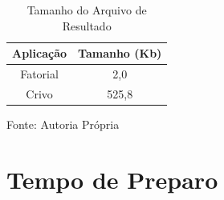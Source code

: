 \begin{table}[hbtp]
\begin{center}
\caption{Tamanho do Arquivo de Resultado}
\label{tab:tam_arquivo}
\begin{tabular}{c|c}
	\hline
		{\bf Aplicação } & {\bf Tamanho (Kb) }\\
	\hline
	Fatorial & 2,0\\ \hline
	Crivo & 525,8\\ \hline
\end{tabular}
\end{center}
\begin{center}
Fonte: Autoria Própria
\end{center}
\end{table}

\section{Tempo de Preparo}